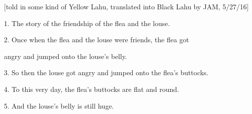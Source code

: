 \setcounter{footnote}{0}

[told in some kind of Yellow Lahu, translated into Black Lahu by JAM, 5/27/16]

1. The story of the friendship of the flea and the louse.

2. Once when the flea and the louse were friends, the flea got

angry and jumped onto the louse's belly.

3. So then the louse got angry and jumped onto the flea's buttocks.

4. To this very day, the flea's buttocks are flat and round.

5. And the louse's belly is still huge.

